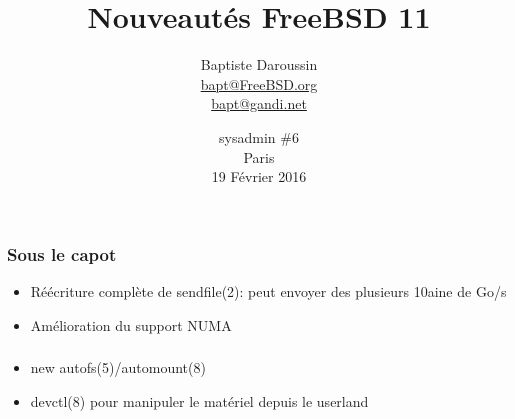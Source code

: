 
\usepackage{color}
\usepackage{listings}
\usepackage{tipa}
\usepackage{svg}
\newcommand{\prestitle}{sysadmin\#6}
\newcommand{\prev}[1]{\href{https://svnweb.freebsd.org/changeset/ports/#1}{r#1}}
\lstset{
	numbers=none,
	frame=l,
	aboveskip=0pt, belowskip=0pt
}

\usepackage{tikz}

\title{Nouveautés FreeBSD 11}
\author{Baptiste Daroussin \\ \url{bapt@FreeBSD.org} \\ \url{bapt@gandi.net}}
\date{sysadmin \#6 \\ Paris \\ 19 Février 2016}


\begin{frame}[plain]
	\titlepage
\end{frame}

\begin{frame}
	\frametitle{Sous le capot}
	\begin{itemize}
		\item Réécriture complète de sendfile(2): peut envoyer des plusieurs 10aine de Go/s
		\item Amélioration du support NUMA
	\end{itemize}
\end{frame}

\begin{frame}
	\frametitle{}
	\begin{itemize}
		\item new autofs(5)/automount(8)
		\item devctl(8) pour manipuler le matériel depuis le userland
	\end{itemize}
\end{frame}

